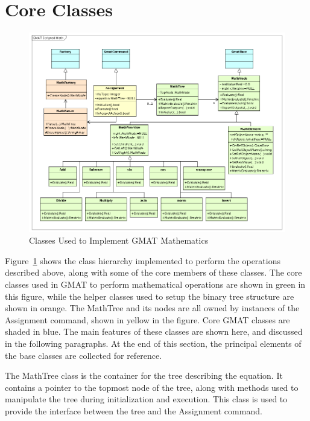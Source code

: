 \section{Core Classes}

\begin{figure}
\begin{center}
\includegraphics[430,336]{Images/MathClasses.png}
\caption{\label{figure:MathClasses}Classes Used to Implement GMAT Mathematics}
\end{center}
\end{figure}

Figure~\ref{figure:MathClasses} shows the class hierarchy implemented to
perform the operations described above, along with some of the core members of
these classes.  The core classes used in GMAT to perform mathematical
operations are shown in green in this figure, while the helper classes used to
setup the binary tree structure are shown in orange.  The MathTree and its
nodes are all owned by instances of the Assignment command, shown in yellow in
the figure.  Core GMAT classes are shaded in blue.  The main features of these
classes are shown here, and discussed in the following paragraphs.  At the end
of this section, the principal elements of the base classes are collected for
reference.

The MathTree class is the container for the tree describing the equation.  It
contains a pointer to the topmost node of the tree, along with methods used to
manipulate the tree during initialization and execution.  This class is used to provide the
interface between the tree and the Assignment command.

